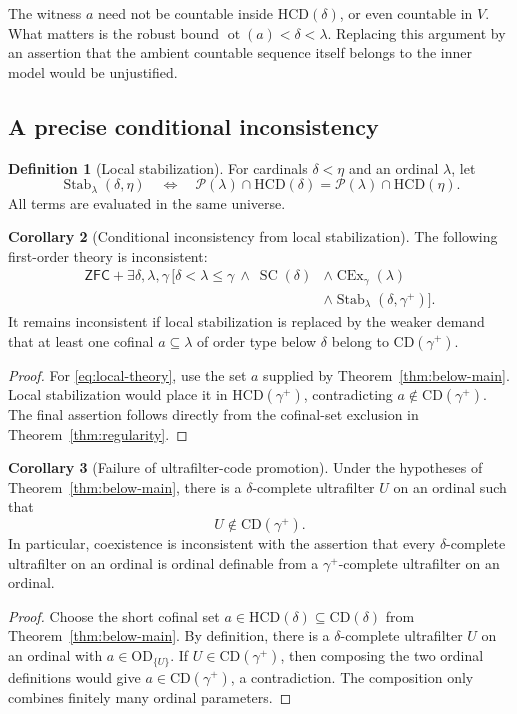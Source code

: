 \documentclass[11pt,letterpaper]{article}
\theoremstyle{definition}
\newtheorem{definition}{Definition}[section]
\newtheorem{corollary}[definition]{Corollary}
\newcommand{\ZFC}{\mathsf{ZFC}}
\newcommand{\OD}{\mathrm{OD}}
\newcommand{\SC}{\operatorname{SC}}
\newcommand{\CEx}{\operatorname{CEx}}
\newcommand{\ot}{\operatorname{ot}}
\newcommand{\CD}{\mathrm{CD}}
\newcommand{\HCD}{\mathrm{HCD}}
\newcommand{\Stab}{\operatorname{Stab}}
\newcommand{\Pow}{\mathcal{P}}
\begin{document}
The witness $a$ need not be countable inside $\HCD(\delta)$, or even countable in $V$. What matters is the robust bound $\ot(a)<\delta<\lambda$. Replacing this argument by an assertion that the ambient countable sequence itself belongs to the inner model would be unjustified.

\subsection{A precise conditional inconsistency}

\begin{definition}[Local stabilization]\label{def:stabilization}
For cardinals $\delta<\eta$ and an ordinal $\lambda$, let
\[
\Stab_\lambda(\delta,\eta)
\quad\Longleftrightarrow\quad
\Pow(\lambda)\cap\HCD(\delta)=\Pow(\lambda)\cap\HCD(\eta).
\]
All terms are evaluated in the same universe.
\end{definition}

\begin{corollary}[Conditional inconsistency from local stabilization]\label{cor:local-inconsistency}
The following first-order theory is inconsistent:
\begin{equation}\label{eq:local-theory}
\begin{aligned}
\ZFC+\exists\delta,\lambda,\gamma\,\bigl[\delta<\lambda\le\gamma\ \wedge\ \SC(\delta)
&\wedge\CEx_\gamma(\lambda)\\
&\wedge\Stab_\lambda(\delta,\gamma^+)\bigr].
\end{aligned}
\end{equation}
It remains inconsistent if local stabilization is replaced by the weaker demand that at least one cofinal $a\subseteq\lambda$ of order type below $\delta$ belong to $\CD(\gamma^+)$.
\end{corollary}
\begin{proof}
For \eqref{eq:local-theory}, use the set $a$ supplied by Theorem~\ref{thm:below-main}. Local stabilization would place it in $\HCD(\gamma^+)$, contradicting $a\notin\CD(\gamma^+)$. The final assertion follows directly from the cofinal-set exclusion in Theorem~\ref{thm:regularity}.
\end{proof}

\begin{corollary}[Failure of ultrafilter-code promotion]\label{cor:promotion}
Under the hypotheses of Theorem~\ref{thm:below-main}, there is a $\delta$-complete ultrafilter $U$ on an ordinal such that
\[
U\notin\CD(\gamma^+).
\]
In particular, coexistence is inconsistent with the assertion that every $\delta$-complete ultrafilter on an ordinal is ordinal definable from a $\gamma^+$-complete ultrafilter on an ordinal.
\end{corollary}
\begin{proof}
Choose the short cofinal set $a\in\HCD(\delta)\subseteq\CD(\delta)$ from Theorem~\ref{thm:below-main}. By definition, there is a $\delta$-complete ultrafilter $U$ on an ordinal with $a\in\OD_{\{U\}}$. If $U\in\CD(\gamma^+)$, then composing the two ordinal definitions would give $a\in\CD(\gamma^+)$, a contradiction. The composition only combines finitely many ordinal parameters.
\end{proof}
\end{document}

